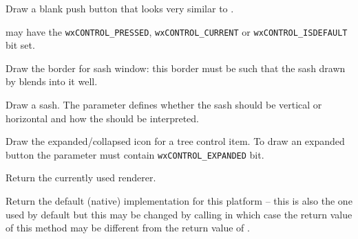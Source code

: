 
Draw a blank push button that looks very similar to .

 may have the \texttt{wxCONTROL\_PRESSED}, \texttt{wxCONTROL\_CURRENT} or
\texttt{wxCONTROL\_ISDEFAULT} bit set.


\label{wxrenderernativedrawsplitterborder}


Draw the border for sash window: this border must be such that the sash
drawn by  blends into it
well.


\label{wxrenderernativedrawsplittersash}


Draw a sash. The  parameter defines whether the sash should be
vertical or horizontal and how the  should be interpreted.


\label{wxrenderernativedrawtreeitembutton}


Draw the expanded/collapsed icon for a tree control item. To draw an expanded
button the  parameter must contain {\tt wxCONTROL\_EXPANDED} bit.


\label{wxrenderernativeget}


Return the currently used renderer.


\label{wxrenderernativegetdefault}


Return the default (native) implementation for this platform -- this is also
the one used by default but this may be changed by calling 
 in which case the return value of this
method may be different from the return value of .


